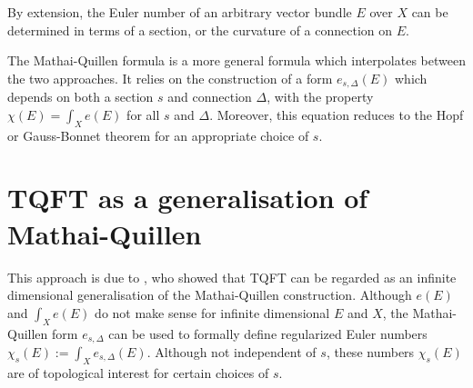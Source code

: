 By extension, the Euler number of an arbitrary vector bundle $E$ over $X$ can be
determined in terms of a section, or the curvature of a connection on  $E$.

The Mathai-Quillen formula \cite{MQformula} is a more general formula which interpolates between
the two approaches. It relies on the construction of a form $e_{s,\Delta}(E)$ which depends
on both a section  $s$ and connection  $\Delta$, with the property
$\chi(E)=\int_X e(E)$ for all $s$ and  $\Delta$. Moreover, this equation reduces
to the Hopf or Gauss-Bonnet theorem for an appropriate choice of $s$. 

\section{TQFT as a generalisation of Mathai-Quillen}
 This approach is
due to \cite{atiyahlagrangians}, who showed that TQFT can be regarded as an
infinite dimensional generalisation of the Mathai-Quillen construction. 
Although $e(E)$ and  $\int_X e(E)$ do not make sense for
infinite dimensional  $E$ and  $X$, the Mathai-Quillen form  $e_{s,\Delta}$ can
be used to formally define regularized Euler numbers $\chi_s(E) := \int_X
e_{s,\Delta}(E)$. Although not independent of $s$, these numbers  $\chi_s(E)$
are of topological interest for certain choices of  $s$.  


